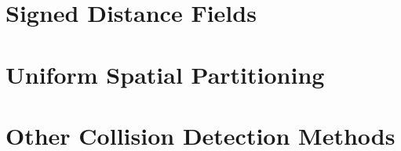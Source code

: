 \section{Signed Distance Fields}
\label{sec:sdf}

\section{Uniform Spatial Partitioning}
\label{sec:usp}

\section{Other Collision Detection Methods}
\label{sec:others}
